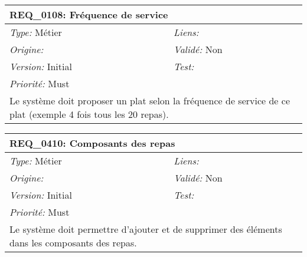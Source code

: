\begin{table}[!h]

\begin{tabular}{|p{60mm}p{100mm}|}

\hline

\multicolumn{2}{|l|}{\textbf{REQ\_0108:} Fréquence de service} \\ \hline

\emph{Type:} Métier & \emph{Liens:}  \\

\emph{Origine:}  & \emph{Validé:} Non \\

\emph{Version:} Initial & \emph{Test:}  \\

\emph{Priorité:} Must & \\ \hline

\multicolumn{2}{|p{16cm}|}{Le système doit proposer un plat selon la fréquence de service de ce plat (exemple 4 fois tous les 20 repas).} \\ \hline

\end{tabular}

\end{table}



\begin{table}[!h]

\begin{tabular}{|p{60mm}p{100mm}|}

\hline

\multicolumn{2}{|l|}{\textbf{REQ\_0410:} Composants des repas} \\ \hline

\emph{Type:} Métier & \emph{Liens:}  \\

\emph{Origine:}  & \emph{Validé:} Non \\

\emph{Version:} Initial & \emph{Test:}  \\

\emph{Priorité:} Must & \\ \hline

\multicolumn{2}{|p{16cm}|}{Le système doit permettre d'ajouter et de supprimer des éléments dans les composants des repas.} \\ \hline

\end{tabular}

\end{table}



